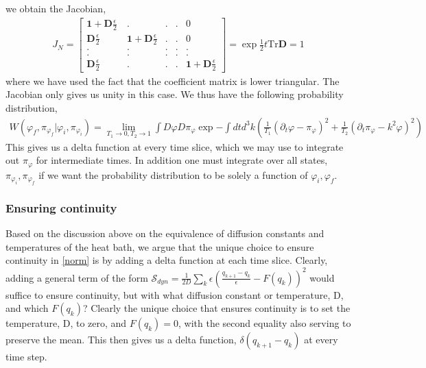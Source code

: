 \documentclass[aps,preprintnumbers,superscriptaddress,longbibliography]{revtex4-1}
\begin{document}
we obtain the Jacobian, 
\begin{align}J_N=
\begin{bmatrix}
    \boldsymbol{1}+\boldsymbol{D}\frac{\epsilon}{2}\ &.&.&.&0\\\boldsymbol{D}\frac{\epsilon}{2}&\boldsymbol{1}+\boldsymbol{D}\frac{\epsilon}{2}&.&.&0\\.&.&.&.&.\\.&.&.&.&.\\\boldsymbol{D}\frac{\epsilon}{2} &.&.&.&\boldsymbol{1}+\boldsymbol{D}\frac{\epsilon}{2}
\end{bmatrix}=\exp{\frac{1}{2}t\text{Tr}\boldsymbol{D}}=1
\end{align}
where we have used the fact that the coefficient matrix is lower triangular. The Jacobian only gives us unity in this case. We thus have the following probability distribution, 
\begin{align}
   W(\varphi_f,\pi_{\varphi_f}|\varphi_i,\pi_{\varphi_i}) =\lim_{T_1\rightarrow 0, T_2\rightarrow1}\int D\varphi D\pi_{\varphi}\exp{-\int dt d^3k (\frac{1}{T_1}( \partial_t\varphi-\pi_{\varphi})^2+\frac{1}{T_2}( \partial_t\pi_{\varphi}-k^2\varphi)^2)}
\end{align}
This gives us a delta function at every time slice, which we may use to integrate out $\pi_{\varphi}$ for intermediate times. In addition one must integrate over all states, $\pi_{\varphi_i},\pi_{\varphi_f}$ if we want the probability distribution to be solely a function of $\varphi_i,\varphi_f$.

\subsubsection{Ensuring continuity}
Based on the discussion above on the equivalence of diffusion constants and temperatures of the heat bath, we argue that the unique choice to ensure continuity in \ref{norm} is by adding a delta function at each time slice.  Clearly, adding a general term of the form $\mathcal{S}_{dyn}=\frac{1}{2D}\sum_k\epsilon (\frac{q_{k+1}-q_k}{\epsilon}-F(q_k))^2$ would suffice to ensure continuity, but with what diffusion constant or temperature, D,  and which $F(q_k)$? Clearly the unique choice that ensures continuity is to set the temperature, D, to zero, and $F(q_k)=0$, with the second equality also serving to preserve the mean.  This then gives us a delta function, $\delta(q_{k+1}-q_k)$ at every time step.
\end{document}
